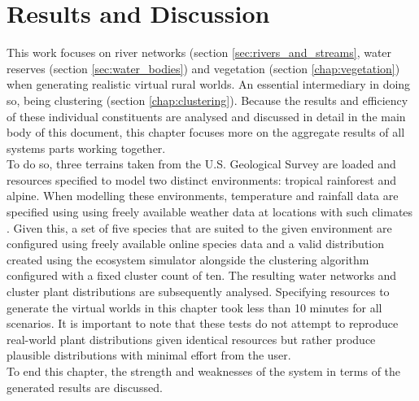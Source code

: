 \chapter{Results and Discussion} \label{chap:results}

This work focuses on river networks (section \ref{sec:rivers_and_streams}, water reserves (section \ref{sec:water_bodies}) and vegetation (section \ref{chap:vegetation}) when generating realistic virtual rural worlds. An essential intermediary in doing so, being clustering (section \ref{chap:clustering}). Because the results and efficiency of these individual constituents are analysed and discussed in detail in the main body of this document, this chapter focuses more on the aggregate results of all systems parts working together. \\

To do so, three terrains taken from the U.S. Geological Survey \protect\footnotemark {} are loaded and resources specified to model two distinct environments: tropical rainforest and alpine. When modelling these environments, temperature and rainfall data are specified using using freely available weather data at locations with such climates \protect\footnotemark {}. Given this, a set of five species that are suited to the given environment are configured using freely available online species data  \protect\footnotemark {} and a valid distribution created using the ecosystem simulator alongside the clustering algorithm configured with a fixed cluster count of ten. The resulting water networks and cluster plant distributions are subsequently analysed. Specifying resources to generate the virtual worlds in this chapter took less than 10 minutes for all scenarios. It is important to note that these tests do not attempt to reproduce real-world plant distributions given identical resources but rather produce plausible distributions with minimal effort from the user. \\

To end this chapter, the strength and weaknesses of the system in terms of the generated results are discussed.\\
